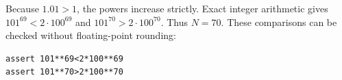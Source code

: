 Because $ 1.01>1 $, the powers increase strictly. Exact integer arithmetic gives $ 101^{69}<2\cdot100^{69}$ and $ 101^{70}>2\cdot100^{70}$. Thus $\boxed{N=70}$. These comparisons can be checked without floating-point rounding:
\begin{verbatim}
assert 101**69<2*100**69
assert 101**70>2*100**70
\end{verbatim}
